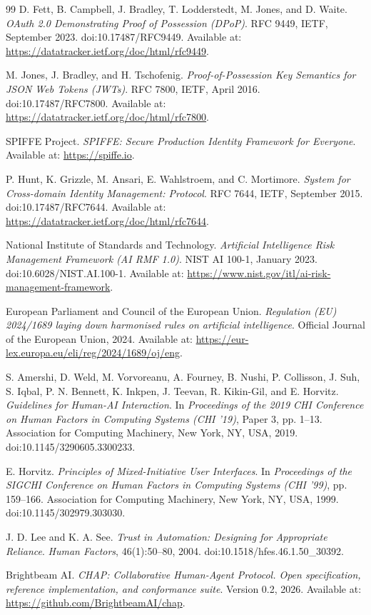 \documentclass[11pt]{article}
\begin{document}
\begin{thebibliography}{99}
D. Fett, B. Campbell, J. Bradley, T. Lodderstedt, M. Jones, and D. Waite. \emph{OAuth 2.0 Demonstrating Proof of Possession (DPoP)}. RFC 9449, IETF, September 2023. doi:10.17487/RFC9449. Available at: \url{https://datatracker.ietf.org/doc/html/rfc9449}.

M. Jones, J. Bradley, and H. Tschofenig. \emph{Proof-of-Possession Key Semantics for JSON Web Tokens (JWTs)}. RFC 7800, IETF, April 2016. doi:10.17487/RFC7800. Available at: \url{https://datatracker.ietf.org/doc/html/rfc7800}.

SPIFFE Project. \emph{SPIFFE: Secure Production Identity Framework for Everyone}. Available at: \url{https://spiffe.io}.

P. Hunt, K. Grizzle, M. Ansari, E. Wahlstroem, and C. Mortimore. \emph{System for Cross-domain Identity Management: Protocol}. RFC 7644, IETF, September 2015. doi:10.17487/RFC7644. Available at: \url{https://datatracker.ietf.org/doc/html/rfc7644}.

National Institute of Standards and Technology. \emph{Artificial Intelligence Risk Management Framework (AI RMF 1.0)}. NIST AI 100-1, January 2023. doi:10.6028/NIST.AI.100-1. Available at: \url{https://www.nist.gov/itl/ai-risk-management-framework}.

European Parliament and Council of the European Union. \emph{Regulation (EU) 2024/1689 laying down harmonised rules on artificial intelligence}. Official Journal of the European Union, 2024. Available at: \url{https://eur-lex.europa.eu/eli/reg/2024/1689/oj/eng}.

S. Amershi, D. Weld, M. Vorvoreanu, A. Fourney, B. Nushi, P. Collisson, J. Suh, S. Iqbal, P. N. Bennett, K. Inkpen, J. Teevan, R. Kikin-Gil, and E. Horvitz. \emph{Guidelines for Human-AI Interaction}. In \emph{Proceedings of the 2019 CHI Conference on Human Factors in Computing Systems (CHI '19)}, Paper 3, pp. 1--13. Association for Computing Machinery, New York, NY, USA, 2019. doi:10.1145/3290605.3300233.

E. Horvitz. \emph{Principles of Mixed-Initiative User Interfaces}. In \emph{Proceedings of the SIGCHI Conference on Human Factors in Computing Systems (CHI '99)}, pp. 159--166. Association for Computing Machinery, New York, NY, USA, 1999. doi:10.1145/302979.303030.

J. D. Lee and K. A. See. \emph{Trust in Automation: Designing for Appropriate Reliance}. \emph{Human Factors}, 46(1):50--80, 2004. doi:10.1518/hfes.46.1.50\_30392.

Brightbeam AI. \emph{CHAP: Collaborative Human-Agent Protocol. Open specification, reference implementation, and conformance suite}. Version 0.2, 2026. Available at: \url{https://github.com/BrightbeamAI/chap}.

\end{thebibliography}
\end{document}
